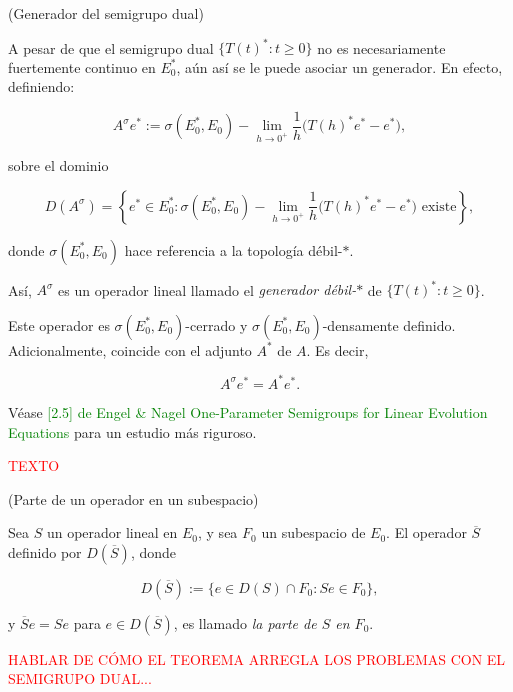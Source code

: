 \begin{Definicion}{(Generador del semigrupo dual)}
    \label{ch:semigrupos:section:dual:def:genSgDual}

    A pesar de que el semigrupo dual $\{T(t)^* : t \geq 0\}$ no es necesariamente fuertemente continuo en $E_0^*$, aún así se le puede asociar un generador. En efecto, definiendo:

    \[A^\sigma e^* := \sigma(E_0^*, E_0)-\lim_{h \rightarrow 0^+} \frac{1}{h}\big(T(h)^*e^* - e^* \big),\]

    sobre el dominio

    \[D(A^\sigma) = \left \{e^* \in E_0^* : \sigma(E_0^*, E_0)-\lim_{h \rightarrow 0^+} \frac{1}{h}\big(T(h)^*e^* - e^* \big) \text{ existe} \right \},\]

    donde $\sigma(E_0^*, E_0)$ hace referencia a la topología débil-$*$.

    Así, $A^\sigma$ es un operador lineal llamado el \textit{generador débil-$*$} de $\{T(t)^* : t \geq 0\}$.

    Este operador es $\sigma(E_0^*, E_0)$-cerrado y $\sigma(E_0^*, E_0)$-densamente definido. Adicionalmente, coincide con el adjunto $A^*$ de $A$. Es decir,

    \[A^\sigma e^* = A^*e^*.\]

    Véase \textcolor{green}{[2.5] de Engel \& Nagel One-Parameter Semigroups for Linear Evolution Equations} para un estudio más riguroso.
\end{Definicion}

\textcolor{red}{TEXTO}\\

\begin{Definicion}{(Parte de un operador en un subespacio)}
    \label{ch:semigrupos:section:dual:def:parteDeSubesp}

    Sea $S$ un operador lineal en $E_0$, y sea $F_0$ un subespacio de $E_0$. El operador $\overline{S}$ definido por $D(\overline{S})$, donde

    \[D(\overline{S}) := \{e \in D(S) \cap F_0 : Se \in F_0\},\]

    y $\overline{S}e = Se$ para $e \in D(\overline{S})$, es llamado \textit{la parte de $S$ en $F_0$}. 
\end{Definicion}

\textcolor{red}{HABLAR DE CÓMO EL TEOREMA ARREGLA LOS PROBLEMAS CON EL SEMIGRUPO DUAL...}\\

